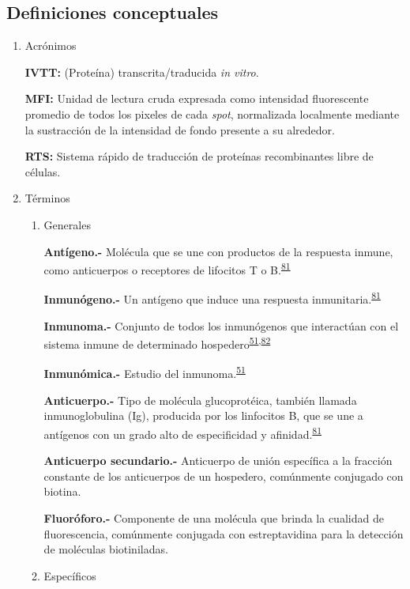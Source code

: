 \documentclass[]{article}
\begin{document}
\subsection{Definiciones conceptuales}\label{definiciones-conceptuales}

\begin{enumerate}
\def\labelenumi{\alph{enumi}.}
\item
  Acrónimos

  \textbf{IVTT:} (Proteína) transcrita/traducida \emph{in vitro}.

  \textbf{MFI:} Unidad de lectura cruda expresada como intensidad
  fluorescente promedio de todos los pixeles de cada \emph{spot},
  normalizada localmente mediante la sustracción de la intensidad de
  fondo presente a su alrededor.

  \textbf{RTS:} Sistema rápido de traducción de proteínas recombinantes
  libre de células.
\item
  Términos

  \begin{enumerate}
  \def\labelenumii{\roman{enumii}.}
  \item
    Generales

    \textbf{Antígeno.-} Molécula que se une con productos de la
    respuesta inmune, como anticuerpos o receptores de lifocitos T o
    B.\textsuperscript{\protect\hyperlink{ref-abbas2012}{81}}

    \textbf{Inmunógeno.-} Un antígeno que induce una respuesta
    inmunitaria.\textsuperscript{\protect\hyperlink{ref-abbas2012}{81}}

    \textbf{Inmunoma.-} Conjunto de todos los inmunógenos que
    interactúan con el sistema inmune de determinado
    hospedero\textsuperscript{\protect\hyperlink{ref-immunomics2016}{51},\protect\hyperlink{ref-sette2005}{82}}

    \textbf{Inmunómica.-} Estudio del
    inmunoma.\textsuperscript{\protect\hyperlink{ref-immunomics2016}{51}}

    \textbf{Anticuerpo.-} Tipo de molécula glucoprotéica, también
    llamada inmunoglobulina (Ig), producida por los linfocitos B, que se
    une a antígenos con un grado alto de especificidad y
    afinidad.\textsuperscript{\protect\hyperlink{ref-abbas2012}{81}}

    \textbf{Anticuerpo secundario.-} Anticuerpo de unión específica a la
    fracción constante de los anticuerpos de un hospedero, comúnmente
    conjugado con biotina.

    \textbf{Fluoróforo.-} Componente de una molécula que brinda la
    cualidad de fluorescencia, comúnmente conjugada con estreptavidina
    para la detección de moléculas biotiniladas.
  \item
    Específicos


\end{enumerate}
\end{enumerate}
\end{document}
